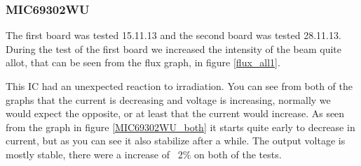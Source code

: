 \documentclass[12pt]{article}
\numberwithin{figure}{section}
\begin{document}
\FloatBarrier

\subsubsection{MIC69302WU}
The first board was tested 15.11.13 and the second board was tested 28.11.13. During the test of the first board we increased the intensity of the beam quite allot, that can be seen from the flux graph, in figure \ref{flux_all1}.

This \ac{IC} had an unexpected reaction to irradiation. You can see from both of the graphs that the current is decreasing and voltage is increasing, normally we would expect the opposite, or at least that the current would increase.
As seen from the graph in figure \ref{MIC69302WU_both} it starts quite early to decrease in current, but as you can see it also stabilize after a while. The output voltage is mostly stable, there were a increase of ~2\% on both of the tests.
\end{document}
